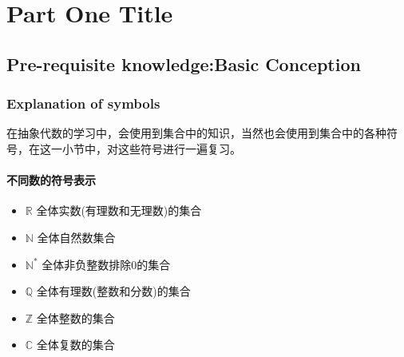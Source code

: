 \documentclass[
	11pt, %
	fleqn, %
	a4paper, %
]{LegrandOrangeBook}
\begin{document}
\pagestyle{empty} %

\tableofcontents %

\listoffigures %

\listoftables %

\pagestyle{fancy} %

\cleardoublepage %


\part{Part One Title}


\chapterspaceabove{6.75cm} %
\chapterspacebelow{7.25cm} %


\chapter{Pre-requisite knowledge:Basic Conception}

\section{Explanation of symbols}
在抽象代数的学习中，会使用到集合中的知识，当然也会使用到集合中的各种符号，在这一小节中，对这些符号进行一遍复习。
\subsection{不同数的符号表示}
\begin{itemize}
	\item $\mathbb{R}$ 全体实数(有理数和无理数)的集合
	\item $\mathbb{N}$ 全体自然数集合
	\item $\mathbb{N^*}$ 全体非负整数排除0的集合
	\item $\mathbb{Q}$ 全体有理数(整数和分数)的集合
	\item $\mathbb{Z}$ 全体整数的集合
	\item $\mathbb{C}$ 全体复数的集合
\end{itemize}
\end{document}
